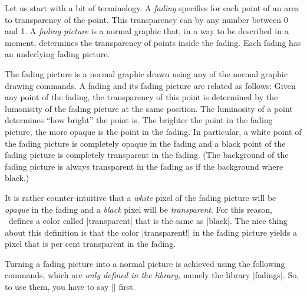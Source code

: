 Let us start with a bit of terminology. A \emph{fading} specifies for
each point of an area to transparency of the point. This transparency
can by any number between 0 and 1. A \emph{fading picture} is a normal
graphic that, in a way to be described in a moment, determines the
transparency of points inside the fading. Each fading has an
underlying fading picture. 

The fading picture is a normal graphic drawn using any of the normal
graphic drawing commands. A fading and its fading picture are related
as follows: Given any point of the fading, the transparency of this
point is determined by the lumonisity of the fading picture at the
same position. The luminosity of a point determines ``how bright'' the
point is. The brighter the point in the fading picture, the more
opaque is the point in the fading. In particular, a white point of the
fading picture is completely opaque in the fading and a black point of
the fading picture is completely transparent in the fading. (The
background of the fading picture is always transparent in the fading
as if the background where black.)

It is rather counter-intuitive that a \emph{white} pixel of the fading
picture will be \emph{opaque} in the fading and a \emph{black} pixel
will be \emph{transparent}. For this reason, \tikzname\ defines a
color called |transparent| that is the same as |black|. The nice thing
about this definition is that the color
|transparent!| in the fading picture yields a
pixel that is  per cent transparent in the fading. 

Turning a fading picture into a normal picture is achieved using the
following commands, which are \emph{only defined in the library},
namely the library |fadings|. So, to use them, you have to say
|\usetikzlibrary{fadings}| first.

